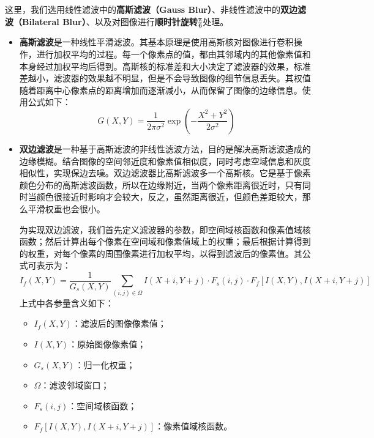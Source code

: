 \documentclass{MathorCupmodeling}
\begin{document}
	这里，我们选用线性滤波中的\textbf{高斯滤波（Gauss Blur）}、非线性滤波中的\textbf{双边滤波（Bilateral Blur）}、以及对图像进行\textbf{顺时针旋转$\boldsymbol{\frac{\pi}{6}}$}处理。
	\begin{itemize}
		\item \textbf{高斯滤波}是一种线性平滑滤波。其基本原理是使用高斯核对图像进行卷积操作，进行加权平均的过程。每一个像素点的值，都由其邻域内的其他像素值和本身经过加权平均后得到。高斯核的标准差和大小决定了滤波器的效果，标准差越小，滤波器的效果越不明显，但是不会导致图像的细节信息丢失。其权值随着距离中心像素点的距离增加而逐渐减小，从而保留了图像的边缘信息。使用公式如下：
		\begin{equation}
			G\left(X,Y\right)=\frac{1}{2\pi\sigma^2}\exp\left(-\frac{X^2+Y^2}{2\sigma^2}\right)
		\end{equation}
		\item \textbf{双边滤波}是一种基于高斯滤波的非线性滤波方法，目的是解决高斯滤波造成的边缘模糊。结合图像的空间邻近度和像素值相似度，同时考虑空域信息和灰度相似性，实现保边去噪。双边滤波器比高斯滤波多一个高斯核。它是基于像素颜色分布的高斯滤波函数，所以在边缘附近，当两个像素距离很近时，只有同时当颜色很接近时影响才会较大，反之，虽然距离很近，但颜色差距较大，那么平滑权重也会很小。
		
		为实现双边滤波，我们首先定义滤波器的参数，即空间域核函数和像素值域核函数；然后计算出每个像素在空间域和像素值域上的权重；最后根据计算得到的权重，对每个像素的周围像素进行加权平均，以得到滤波后的像素值。其公式可表示为：
		\begin{equation}
			I_f\left( X,Y \right) =\frac{1}{G_s\left( X,Y \right)}\sum_{\left( i,j \right) \in \Omega}{I\left( X+i,Y+j \right) \cdot F_s\left( i,j \right)}\cdot F_f\left[ I\left( X,Y \right) ,I\left( X+i,Y+j \right) \right] 
		\end{equation}
		上式中各参量含义如下：
		\begin{itemize}
			\item $I_f\left(X,Y\right)$：滤波后的图像像素值；
			\item $I\left(X,Y\right)$：原始图像像素值；
			\item $G_s\left(X,Y\right)$：归一化权重；
			\item $\Omega$：滤波邻域窗口；
			\item $F_s\left(i,j\right)$：空间域核函数；
			\item $F_f\left[ I\left( X,Y \right) ,I\left( X+i,Y+j \right) \right]$：像素值域核函数。
		\end{itemize}
	\end{itemize}
	
\end{document}
